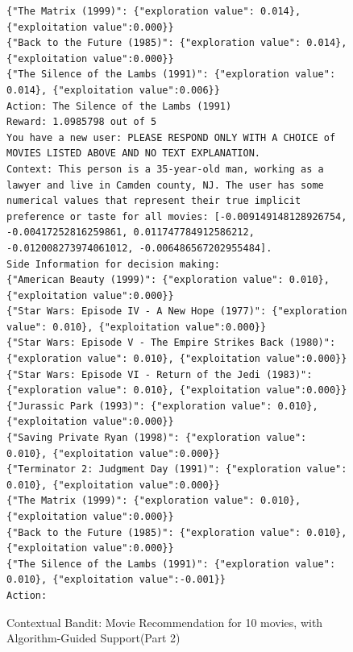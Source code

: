 \documentclass[11pt, logo]{googledeepmind}
\newcommand{\ag}{Algorithm-Guided Support\xspace}
\theoremstyle{plain}
\theoremstyle{definition}
\begin{document}
\begin{figure}[ht]
\begin{lstlisting}[escapechar=!]
{"The Matrix (1999)": {"exploration value": 0.014}, {"exploitation value":0.000}}
{"Back to the Future (1985)": {"exploration value": 0.014}, {"exploitation value":0.000}}
{"The Silence of the Lambs (1991)": {"exploration value": 0.014}, {"exploitation value":0.006}}
Action: The Silence of the Lambs (1991)
Reward: 1.0985798 out of 5
You have a new user: PLEASE RESPOND ONLY WITH A CHOICE of MOVIES LISTED ABOVE AND NO TEXT EXPLANATION.
Context: This person is a 35-year-old man, working as a lawyer and live in Camden county, NJ. The user has some numerical values that represent their true implicit preference or taste for all movies: [-0.009149148128926754, -0.00417252816259861, 0.011747784912586212, -0.012008273974061012, -0.006486567202955484].
Side Information for decision making:
{"American Beauty (1999)": {"exploration value": 0.010}, {"exploitation value":0.000}}
{"Star Wars: Episode IV - A New Hope (1977)": {"exploration value": 0.010}, {"exploitation value":0.000}}
{"Star Wars: Episode V - The Empire Strikes Back (1980)": {"exploration value": 0.010}, {"exploitation value":0.000}}
{"Star Wars: Episode VI - Return of the Jedi (1983)": {"exploration value": 0.010}, {"exploitation value":0.000}}
{"Jurassic Park (1993)": {"exploration value": 0.010}, {"exploitation value":0.000}}
{"Saving Private Ryan (1998)": {"exploration value": 0.010}, {"exploitation value":0.000}}
{"Terminator 2: Judgment Day (1991)": {"exploration value": 0.010}, {"exploitation value":0.000}}
{"The Matrix (1999)": {"exploration value": 0.010}, {"exploitation value":0.000}}
{"Back to the Future (1985)": {"exploration value": 0.010}, {"exploitation value":0.000}}
{"The Silence of the Lambs (1991)": {"exploration value": 0.010}, {"exploitation value":-0.001}}
Action:
    \end{lstlisting}
    \caption{Contextual Bandit: Movie Recommendation for 10 movies, with \ag (Part 2)}
    \label{fig:cb_movie_10_rh_ag_part2}
\end{figure}
\end{document}

